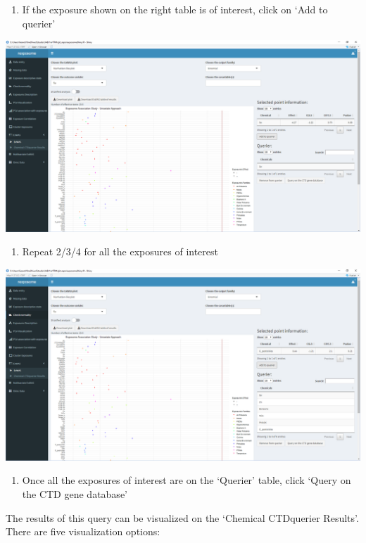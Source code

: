 \documentclass[
]{book}
\providecommand{\tightlist}{%
  \setlength{\itemsep}{0pt}\setlength{\parskip}{0pt}}
\begin{document}
\begin{enumerate}
\def\labelenumi{\arabic{enumi}.}
\setcounter{enumi}{3}
\tightlist
\item
  If the exposure shown on the right table is of interest, click on `Add to querier'
\end{enumerate}

\includegraphics{images/analysis7_4_1.png}

\begin{enumerate}
\def\labelenumi{\arabic{enumi}.}
\setcounter{enumi}{4}
\tightlist
\item
  Repeat 2/3/4 for all the exposures of interest
\end{enumerate}

\includegraphics{images/analysis7_4_2.png}

\begin{enumerate}
\def\labelenumi{\arabic{enumi}.}
\setcounter{enumi}{5}
\tightlist
\item
  Once all the exposures of interest are on the `Querier' table, click `Query on the CTD gene database'
\end{enumerate}

The results of this query can be visualized on the `Chemical CTDquerier Results'. There are five visualization options:
\end{document}
